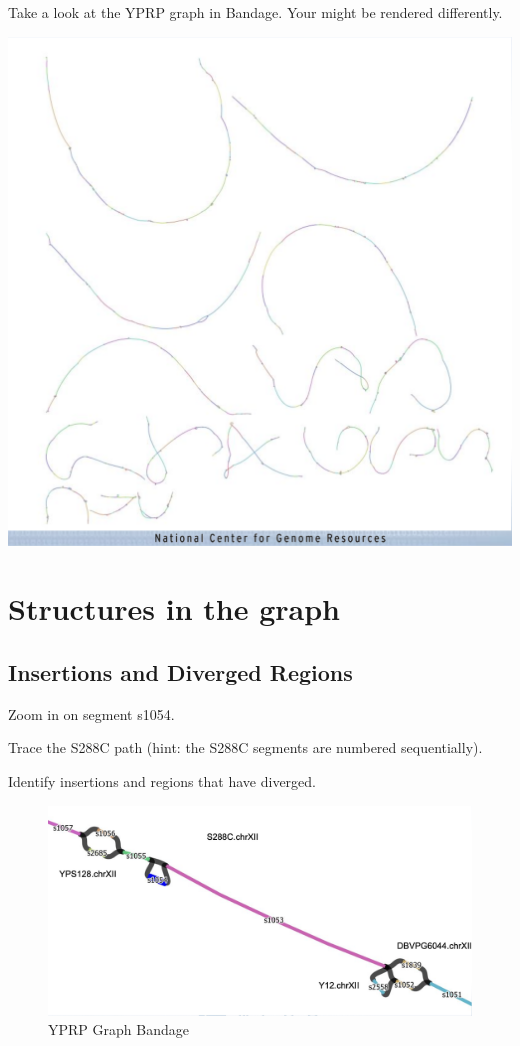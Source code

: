 \documentclass[
]{book}
\begin{document}
Take a look at the YPRP graph in Bandage. Your might be rendered differently.

\includegraphics[width=1\textwidth,height=\textheight]{./Figures/YPRPBandage1.png}

\hypertarget{structures-in-the-graph}{%
\section{Structures in the graph}\label{structures-in-the-graph}}

\hypertarget{insertions-and-diverged-regions}{%
\subsection*{Insertions and Diverged Regions}\label{insertions-and-diverged-regions}}

Zoom in on segment s1054.

Trace the S288C path (hint: the S288C segments are numbered sequentially).

Identify insertions and regions that have diverged.

\begin{figure}
\centering
\includegraphics[width=1\textwidth,height=\textheight]{./Figures/YPRPBandage2.png}
\caption{YPRP Graph Bandage}
\end{figure}
\end{document}

